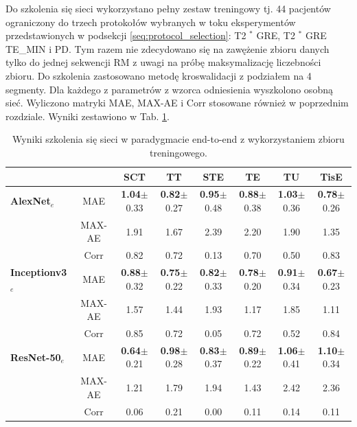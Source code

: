 Do szkolenia się sieci wykorzystano pełny zestaw treningowy tj. 44 pacjentów ograniczony do trzech protokołów wybranych w toku eksperymentów przedstawionych w podsekcji \ref{seq:protocol_selection}: T2 $^\ast$ GRE, T2 $^\ast$ GRE TE\_MIN i PD. Tym razem nie zdecydowano się na zawężenie zbioru danych tylko do jednej sekwencji RM z uwagi na próbę maksymalizację liczebności zbioru. Do szkolenia zastosowano metodę kroswalidacji z podziałem na 4 segmenty. Dla każdego z parametrów z wzorca odniesienia wyszkolono osobną sieć. Wyliczono matryki MAE, MAX-AE i Corr stosowane również w poprzednim rozdziale. Wyniki zestawiono w Tab. \ref{tab:end-to-endTrain}.
\begin{table}[ht]
\scriptsize
\setlength{\tabcolsep}{1pt}
\centering
\caption{Wyniki szkolenia się sieci w paradygmacie end-to-end z wykorzystaniem zbioru treningowego.}
\label{tab:end-to-endTrain}
\begin{tabular}{lc||c|c|c|c|c|c}
	&& \textbf{SCT} & \textbf{TT} & \textbf{STE} & \textbf{TE} & \textbf{TU} & \textbf{TisE}\\ \hline
	\textbf{AlexNet$_{e}$} & MAE & \textbf{1.04}$\pm$0.33 & \textbf{0.82}$\pm$0.27 & \textbf{0.95}$\pm$0.48 & \textbf{0.88}$\pm$0.38 & \textbf{1.03}$\pm$0.36 & \textbf{0.78}$\pm$0.26  \\
	&MAX-AE & 1.91 & 1.67 & 2.39 & 2.20 & 1.90 & 1.35\\ 
	&Corr & 0.82 & 0.72 & 0.13 & 0.70 & 0.50 & 0.83 \\ \hline
	\textbf{Inceptionv3$_{e}$} & MAE & \textbf{0.88}$\pm$0.32 & \textbf{0.75}$\pm$0.22 & \textbf{0.82}$\pm$0.33 & \textbf{0.78}$\pm$0.20 & \textbf{0.91}$\pm$0.34 & \textbf{0.67}$\pm$0.23 \\
	&MAX-AE & 1.57 & 1.44 & 1.93 & 1.17 & 1.85 & 1.11 \\ 
	&Corr & 0.85 & 0.72 & 0.05 & 0.72 & 0.52 & 0.84 \\ \hline
	\textbf{ResNet-50$_{e}$} & MAE & \textbf{0.64}$\pm$0.21 & \textbf{0.98}$\pm$0.28 & \textbf{0.83}$\pm$0.37 & \textbf{0.89}$\pm$0.22 & \textbf{1.06}$\pm$0.41 & \textbf{1.10}$\pm$0.34  \\
	&MAX-AE & 1.21 & 1.79 & 1.94 & 1.43 & 2.42 & 2.36\\
	&Corr & 0.06 & 0.21 & 0.00 & 0.11 & 0.14 & 0.11\\
	
	
\end{tabular}
\end{table}

